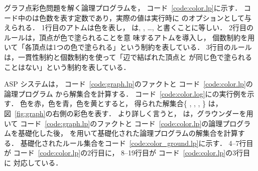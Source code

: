 グラフ点彩色問題を解く論理プログラムを，
コード~\ref{code:color.lp}に示す．
コード中のは色数を表す定数であり，実際の値は実行時に
{\clingo}のオプションとして与えられる．
1行目のアトムは色を表し，
は, , \ldots,
と書くことに等しい．
%
2行目のルールは，頂点が色で塗られることを意
味するアトムを導入し，
個数制約を用いて「各頂点は1つの色で塗られる」という制約を表している．
3行目のルールは，一貫性制約と個数制約を使って「辺で結ばれた頂点と
が同じ色で塗られることはない」という制約を表している．

ASP システムは，
コード~\ref{code:graph.lp}のファクトと
コード~\ref{code:color.lp}の論理プログラム
から解集合を計算する．
コード~\ref{code:color.log}に{\clingo}の実行例を示す．
色を赤，色を青，色を黄とすると，
得られた解集合\{
,
,
,
\}
は，図~\ref{fig:graph}の右側の彩色を表す．
より詳しく言うと，
{\clingo}は，グラウンダー{\gringo}を用いて
コード~\ref{code:graph.lp}のファクトと
コード~\ref{code:color.lp}の論理プログラムを基礎化した後，
{\clasp}を用いて基礎化された論理プログラムの解集合を計算する．
基礎化されたルール集合をコード~\ref{code:color_ground.lp}に示す．
4--7行目が
コード~\ref{code:color.lp}の2行目に，
8--19行目が
コード~\ref{code:color.lp}の3行目に
対応している．

